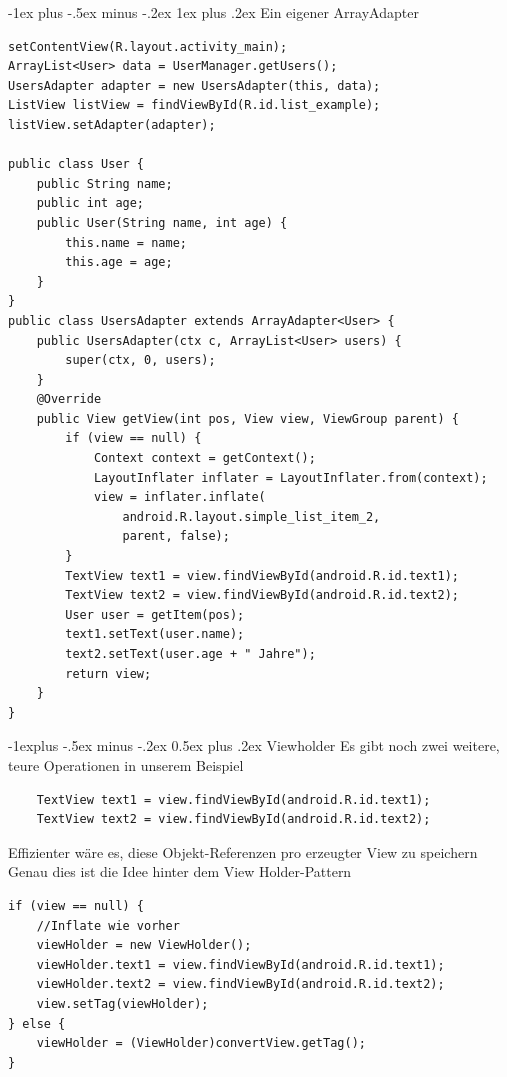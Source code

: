 \documentclass[10pt,landscape,a4paper]{article}
\makeatletter
\renewcommand{\subsection}{\@startsection{subsection}{2}{0mm}%
                                {-1explus -.5ex minus -.2ex}%
                                {0.5ex plus .2ex}%
                                {\normalfont\small\bfseries}}
\renewcommand{\subsubsection}{\@startsection{subsubsection}{3}{0mm}%
                                {-1ex plus -.5ex minus -.2ex}%
                                {1ex plus .2ex}%
                                {\normalfont\footnotesize\bfseries}}
\makeatother
\begin{document}
\begin{multicols*}{3}
\subsubsection{Ein eigener ArrayAdapter}
\begin{verbatim}
setContentView(R.layout.activity_main);
ArrayList<User> data = UserManager.getUsers();
UsersAdapter adapter = new UsersAdapter(this, data);
ListView listView = findViewById(R.id.list_example);
listView.setAdapter(adapter);

public class User {
    public String name;
    public int age;
    public User(String name, int age) {
        this.name = name;
        this.age = age;
    }
}
public class UsersAdapter extends ArrayAdapter<User> {
    public UsersAdapter(ctx c, ArrayList<User> users) {
        super(ctx, 0, users);
    }
    @Override
    public View getView(int pos, View view, ViewGroup parent) {
        if (view == null) {
            Context context = getContext();
            LayoutInflater inflater = LayoutInflater.from(context);
            view = inflater.inflate(
                android.R.layout.simple_list_item_2,
                parent, false);
        }
        TextView text1 = view.findViewById(android.R.id.text1);
        TextView text2 = view.findViewById(android.R.id.text2);
        User user = getItem(pos);
        text1.setText(user.name);
        text2.setText(user.age + " Jahre");
        return view;
    }
}
\end{verbatim}
\subsection{Viewholder}
Es gibt noch zwei weitere, teure Operationen in unserem Beispiel
\begin{verbatim}
    TextView text1 = view.findViewById(android.R.id.text1);
    TextView text2 = view.findViewById(android.R.id.text2);
\end{verbatim}
Effizienter wäre es, diese Objekt-Referenzen pro erzeugter View zu speichern\\
Genau dies ist die Idee hinter dem View Holder-Pattern
\begin{verbatim}
if (view == null) {
    //Inflate wie vorher
    viewHolder = new ViewHolder();
    viewHolder.text1 = view.findViewById(android.R.id.text1);
    viewHolder.text2 = view.findViewById(android.R.id.text2);
    view.setTag(viewHolder);
} else {
    viewHolder = (ViewHolder)convertView.getTag();
}
\end{verbatim}


\end{multicols*}
\end{document}
